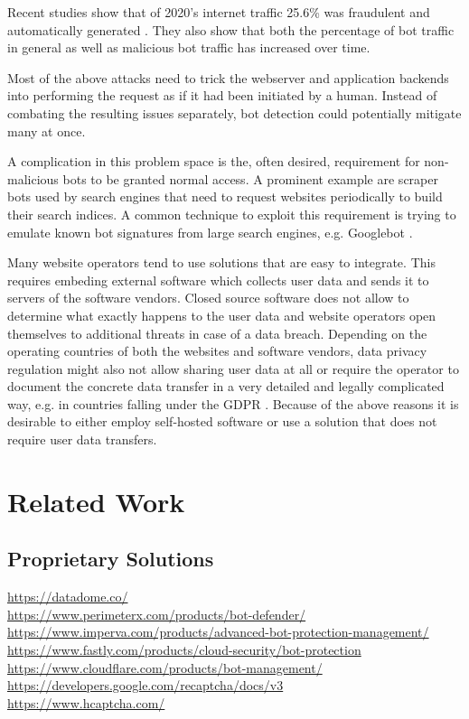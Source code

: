 \documentclass[
    fontsize=12pt,
    headings=small,
    parskip=half,           %
    bibliography=totoc,
    numbers=noenddot,       %
    open=any,               %
    final                   %
    ]{scrreprt}
\begin{document}
Recent studies show that of 2020's internet traffic 25.6\% was fraudulent and automatically generated \cite{BAD_BOT_REPORT2020} \cite{BAD_BOT_REPORT2021}. They also show that both the percentage of bot traffic in general as well as malicious bot traffic has increased over time.

Most of the above attacks need to trick the webserver and application backends into performing the request as if it had been initiated by a human. Instead of combating the resulting issues separately, bot detection could potentially mitigate many at once.

A complication in this problem space is the, often desired, requirement for non-malicious bots to be granted normal access. A prominent example are scraper bots used by search engines that need to request websites periodically to build their search indices. A common technique to exploit this requirement is trying to emulate known bot signatures from large search engines, e.g. Googlebot \cite{8421894}.

Many website operators tend to use solutions that are easy to integrate. This requires embeding external software which collects user data and sends it to servers of the software vendors. Closed source software does not allow to determine what exactly happens to the user data and website operators open themselves to additional threats in case of a data breach. Depending on the operating countries of both the websites and software vendors, data privacy regulation might also not allow sharing user data at all or require the operator to document the concrete data transfer in a very detailed and legally complicated way, e.g. in countries falling under the GDPR \cite{GDPR}. Because of the above reasons it is desirable to either employ self-hosted software or use a solution that does not require user data transfers.



\chapter{Related Work}

\section{Proprietary Solutions}

\url{https://datadome.co/} \\
\url{https://www.perimeterx.com/products/bot-defender/} \\
\url{https://www.imperva.com/products/advanced-bot-protection-management/} \\
\url{https://www.fastly.com/products/cloud-security/bot-protection} \\
\url{https://www.cloudflare.com/products/bot-management/} \\
\url{https://developers.google.com/recaptcha/docs/v3} \\
\url{https://www.hcaptcha.com/} \\
\end{document}
